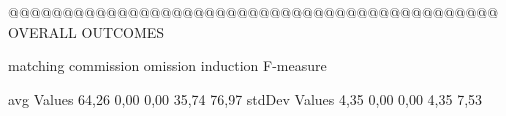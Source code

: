 @@@@@@@@@@@@@@@@@@@@@@@@@@@@@@@@@@@@@@@@@@@@@ OVERALL OUTCOMES

               matching commission   omission  induction  F-measure
               
avg Values      64,26       0,00       0,00      35,74     76,97        
stdDev Values    4,35       0,00       0,00       4,35      7,53        